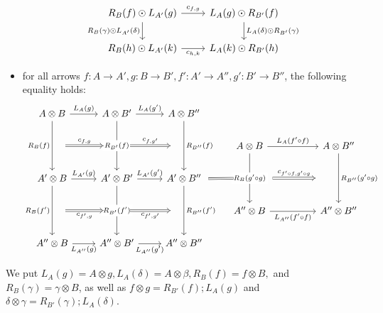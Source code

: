 \begin{defn}{}
\begin{itemize}
\[\begin{tikzcd}
        	{R_B(f)\odot L_{A'}(g)} & {L_A(g)\odot R_{B'}(f)} \\
        	{R_B(h)\odot L_{A'}(k)} & {L_A(k)\odot R_{B'}(h)}
        	\arrow["{c_{f,g}}", from=1-1, to=1-2]
        	\arrow["{L_A(\delta)\odot R_{B'}(\gamma)}", from=1-2, to=2-2]
        	\arrow["{R_B(\gamma)\odot L_{A'}(\delta)}"', from=1-1, to=2-1]
        	\arrow["{c_{h,k}}"', from=2-1, to=2-2]
        \end{tikzcd}\]
        \item for all arrows $f:A\rightarrow A',g:B\rightarrow B', f':A'\rightarrow A'', g':B'\rightarrow B''$, the following equality holds:
        \[\begin{tikzcd}
        	{A\otimes B} & {A\otimes B'} & {A\otimes B''} \\
        	&&& {A\otimes B} && {A\otimes B''} \\
        	{A'\otimes B} & {A'\otimes B'} & {A'\otimes B''} \\
        	&&& {A''\otimes B} && {A''\otimes B''} \\
        	{A''\otimes B} & {A''\otimes B'} & {A''\otimes B''}
        	\arrow["{L_A(g)}", from=1-1, to=1-2]
        	\arrow["{L_A(g')}", from=1-2, to=1-3]
        	\arrow["{L_{A'}(g)}", from=3-1, to=3-2]
        	\arrow["{L_{A'}(g')}", from=3-2, to=3-3]
        	\arrow["{L_{A''}(g)}"', from=5-1, to=5-2]
        	\arrow["{L_{A''}(g')}"', from=5-2, to=5-3]
        	\arrow[""{name=0, anchor=center, inner sep=0}, "{R_B(f)}"', from=1-1, to=3-1]
        	\arrow[""{name=1, anchor=center, inner sep=0}, "{R_B(f')}"', from=3-1, to=5-1]
        	\arrow[""{name=2, anchor=center, inner sep=0}, "{R_{B'}(f)}"{description}, from=1-2, to=3-2]
        	\arrow[""{name=3, anchor=center, inner sep=0}, "{R_{B'}(f')}"{description}, from=3-2, to=5-2]
        	\arrow[""{name=4, anchor=center, inner sep=0}, "{R_{B''}(f')}", from=3-3, to=5-3]
        	\arrow[""{name=5, anchor=center, inner sep=0}, "{R_{B''}(f)}", from=1-3, to=3-3]
        	\arrow["{L_{A''}(f'\circ f)}"', from=4-4, to=4-6]
        	\arrow["{L_A(f'\circ f)}", from=2-4, to=2-6]
        	\arrow[""{name=6, anchor=center, inner sep=0}, "{R_{B''}(g'\circ g)}", from=2-6, to=4-6]
        	\arrow[""{name=7, anchor=center, inner sep=0}, "{R_B(g'\circ g)}"{description}, from=2-4, to=4-4]
        	\arrow["{c_{f,g}}", shorten <=13pt, shorten >=13pt, Rightarrow, from=0, to=2]
        	\arrow["{c_{f,g'}}", shorten <=13pt, shorten >=13pt, Rightarrow, from=2, to=5]
        	\arrow["{c_{f',g}}"', shorten <=13pt, shorten >=13pt, Rightarrow, from=1, to=3]
        	\arrow["{c_{f',g'}}"', shorten <=13pt, shorten >=13pt, Rightarrow, from=3, to=4]
        	\arrow[shorten <=3pt, shorten >=16pt, Rightarrow, no head, from=3-3, to=7]
        	\arrow["{c_{f'\circ f,g'\circ g}}", shorten <=23pt, shorten >=23pt, Rightarrow, from=7, to=6]
        \end{tikzcd}\]
    \end{itemize}
    We put $L_A(g) = A\otimes g, L_A(\delta) = A\otimes \beta, R_B(f) = f\otimes B,$ and $R_B(\gamma) = \gamma\otimes B$, as well as $f\otimes g = R_{B'}(f);L_A(g)$ and $\delta\otimes \gamma = R_{B'}(\gamma);L_A(\delta)$.
\end{defn}

